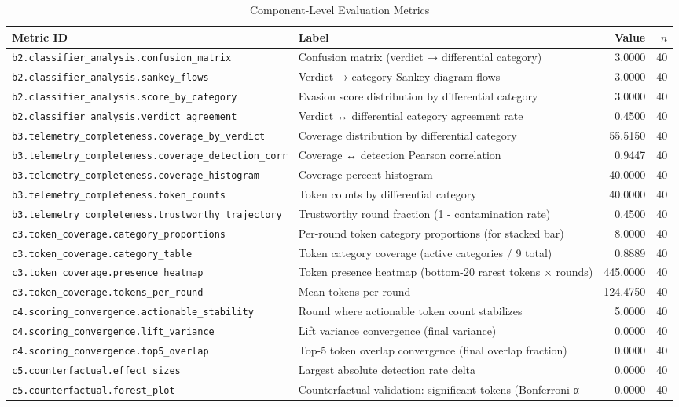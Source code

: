 \begin{table}[htbp]
\centering
\caption{Component-Level Evaluation Metrics}
\label{tab:component-metrics}
\begin{tabular}{llrr}
\toprule
Metric ID & Label & Value & $n$ \\
\midrule
\texttt{b2.classifier\_analysis.confusion\_matrix} & Confusion matrix (verdict → differential category) & 3.0000 & 40 \\
\texttt{b2.classifier\_analysis.sankey\_flows} & Verdict → category Sankey diagram flows & 3.0000 & 40 \\
\texttt{b2.classifier\_analysis.score\_by\_category} & Evasion score distribution by differential category & 3.0000 & 40 \\
\texttt{b2.classifier\_analysis.verdict\_agreement} & Verdict ↔ differential category agreement rate & 0.4500 & 40 \\
\midrule
\texttt{b3.telemetry\_completeness.coverage\_by\_verdict} & Coverage distribution by differential category & 55.5150 & 40 \\
\texttt{b3.telemetry\_completeness.coverage\_detection\_corr} & Coverage ↔ detection Pearson correlation & 0.9447 & 40 \\
\texttt{b3.telemetry\_completeness.coverage\_histogram} & Coverage percent histogram & 40.0000 & 40 \\
\texttt{b3.telemetry\_completeness.token\_counts} & Token counts by differential category & 40.0000 & 40 \\
\texttt{b3.telemetry\_completeness.trustworthy\_trajectory} & Trustworthy round fraction (1 - contamination rate) & 0.4500 & 40 \\
\midrule
\texttt{c3.token\_coverage.category\_proportions} & Per-round token category proportions (for stacked bar) & 8.0000 & 40 \\
\texttt{c3.token\_coverage.category\_table} & Token category coverage (active categories / 9 total) & 0.8889 & 40 \\
\texttt{c3.token\_coverage.presence\_heatmap} & Token presence heatmap (bottom-20 rarest tokens × rounds) & 445.0000 & 40 \\
\texttt{c3.token\_coverage.tokens\_per\_round} & Mean tokens per round & 124.4750 & 40 \\
\midrule
\texttt{c4.scoring\_convergence.actionable\_stability} & Round where actionable token count stabilizes & 5.0000 & 40 \\
\texttt{c4.scoring\_convergence.lift\_variance} & Lift variance convergence (final variance) & 0.0000 & 40 \\
\texttt{c4.scoring\_convergence.top5\_overlap} & Top-5 token overlap convergence (final overlap fraction) & 0.0000 & 40 \\
\midrule
\texttt{c5.counterfactual.effect\_sizes} & Largest absolute detection rate delta & 0.0000 & 40 \\
\texttt{c5.counterfactual.forest\_plot} & Counterfactual validation: significant tokens (Bonferroni α & 0.0000 & 40 \\
\bottomrule
\end{tabular}
\end{table}
